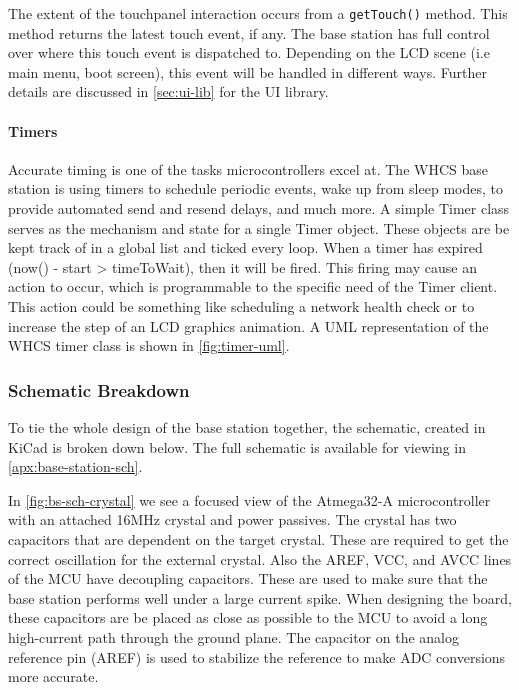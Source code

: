 The extent of the touchpanel interaction occurs from a \texttt{getTouch()}
method. This method returns the latest touch event, if any. The base
station has full control over where this touch event is dispatched to.
Depending on the LCD scene (i.e main menu, boot screen), this event will be
handled in different ways. Further details are discussed in
\autoref{sec:ui-lib} for the UI library.

\paragraph{Timers}
Accurate timing is one of the tasks microcontrollers excel at. The WHCS base
station is using timers to schedule periodic events, wake up from sleep
modes, to provide automated send and resend delays, and much more. A simple
Timer class serves as the mechanism and state for a single Timer object.
These objects are be kept track of in a global list and ticked every loop.
When a timer has expired (now() - start > timeToWait), then it will be
fired. This firing may cause an action to occur, which is programmable to the
specific need of the Timer client. This action could be something like scheduling a network health
check or to increase the step of an LCD graphics animation. A UML representation of the WHCS timer class is shown in \autoref{fig:timer-uml}.


\subsubsection{Schematic Breakdown}
To tie the whole design of the base station together, the schematic, created in KiCad is broken down below. The full schematic is available for viewing in \autoref{apx:base-station-sch}.

In \autoref{fig:bs-sch-crystal} we see a focused view of the Atmega32-A
microcontroller with an attached 16MHz crystal and power passives. The crystal
has two capacitors that are dependent on the target crystal. These are required
to get the correct oscillation for the external crystal. Also the AREF, VCC,
and AVCC lines of the MCU have decoupling capacitors. These are used to make
sure that the base station performs well under a large current spike. When
designing the board, these capacitors are be placed as close as possible to
the MCU to avoid a long high-current path through the ground plane. The
capacitor on the analog reference pin (AREF) is used to stabilize the reference
to make ADC conversions more accurate.


